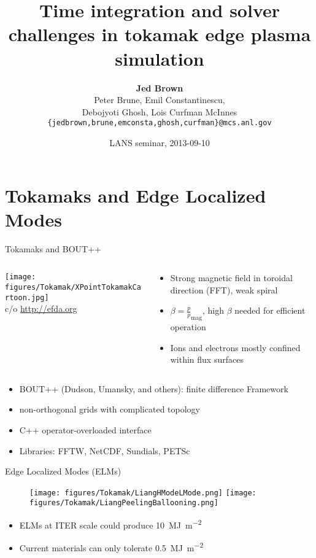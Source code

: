 \documentclass{beamer}
\title{Time integration and solver challenges in tokamak edge plasma simulation}
\author{{\bf Jed Brown} \\
Peter Brune, Emil Constantinescu, \\
Debojyoti Ghosh, Lois Curfman McInnes \\
\texttt{\{jedbrown,brune,emconsta,ghosh,curfman\}@mcs.anl.gov}
}
\institute
{
  Mathematics and Computer Science Division \\ Argonne National Laboratory
}
\date{LANS seminar, 2013-09-10}
\begin{document}
\lstset{language=C}
\normalem

\begin{frame}
  \titlepage
\end{frame}

\section{Tokamaks and Edge Localized Modes}
\begin{frame}{Tokamaks and BOUT++}
  \begin{columns}
    \begin{column}{.5\textwidth}
      \texttt{[image: figures/Tokamak/XPointTokamakCartoon.jpg]} \\
      {\scriptsize c/o \url{http://efda.org}}
    \end{column}
    \begin{column}{.5\textwidth}
      \begin{itemize}
      \item Strong magnetic field in toroidal direction (FFT), weak spiral
      \item $\beta = \frac p p_{\text{mag}}$, high $\beta$ needed for efficient operation
      \item Ions and electrons mostly confined within flux surfaces
      \end{itemize}
    \end{column}
  \end{columns}
  \begin{itemize}
  \item BOUT++ (Dudson, Umansky, and others): finite difference Framework
  \item non-orthogonal grids with complicated topology
  \item C++ operator-overloaded interface
  \item Libraries: FFTW, NetCDF, Sundials, PETSc
  \end{itemize}
\end{frame}

\begin{frame}{Edge Localized Modes (ELMs)}
  \begin{figure}
    \centering
    \texttt{[image: figures/Tokamak/LiangHModeLMode.png]}
    \texttt{[image: figures/Tokamak/LiangPeelingBallooning.png]}
  \end{figure}
  \begin{itemize}
  \item ELMs at ITER scale could produce \SI{10}{\mega\joule\per\meter\squared}
  \item Current materials can only tolerate \SI{.5}{\mega\joule\per\meter\squared}
  \end{itemize}
\end{frame}
\end{document}
